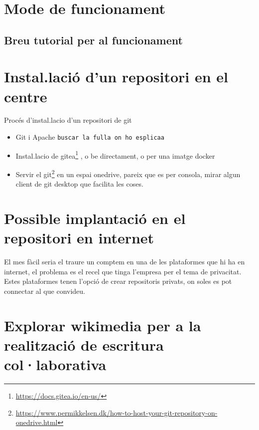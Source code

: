 \documentclass[
  10pt,
]{krantz}
\DeclareRobustCommand{\href}[2]{#2\footnote{\url{#1}}}
\begin{document}
\hypertarget{mode-de-funcionament}{%
\section{Mode de funcionament}\label{mode-de-funcionament}}

\hypertarget{breu-tutorial-per-al-funcionament}{%
\subsection{Breu tutorial per al funcionament}\label{breu-tutorial-per-al-funcionament}}

\hypertarget{instal.laciuxf3-dun-repositori-en-el-centre}{%
\section{Instal.lació d'un repositori en el centre}\label{instal.laciuxf3-dun-repositori-en-el-centre}}

Procés d'instal.lacio d'un repositori de git

\begin{itemize}
\item
  Git i Apache \texttt{buscar\ la\ fulla\ on\ ho\ esplicaa}
\item
  Instal.lacio de \href{https://docs.gitea.io/en-us/}{gitea} , o be directament, o per una imatge docker
\item
  Servir el \href{https://www.permikkelsen.dk/how-to-host-your-git-repository-on-onedrive.html}{git} en un espai onedrive, pareix que es per consola, mirar algun client de git desktop que facilita les coses.
\end{itemize}

\hypertarget{possible-implantaciuxf3-en-el-repositori-en-internet}{%
\section{Possible implantació en el repositori en internet}\label{possible-implantaciuxf3-en-el-repositori-en-internet}}

El mes fàcil seria el traure un comptem en una de les plataformes que hi ha en internet, el problema es el recel que tinga l'empresa per el tema de privacitat. Estes plataformes tenen l'opció de crear repositoris privats, on soles es pot connectar al que convideu.

\hypertarget{explorar-wikimedia-per-a-la-realitzaciuxf3-de-escritura-collaborativa}{%
\section{Explorar wikimedia per a la realització de escritura col·laborativa}\label{explorar-wikimedia-per-a-la-realitzaciuxf3-de-escritura-collaborativa}}
\end{document}
